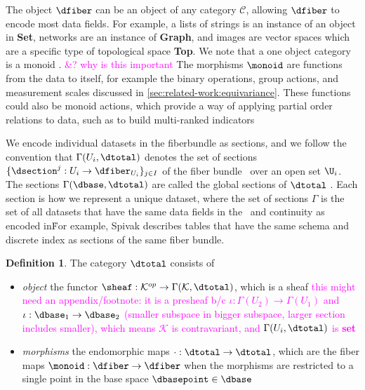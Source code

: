 \documentclass[10pt,journal,compsoc]{IEEEtran}
\newcommand{\note}[1]{\textcolor{magenta}{#1}}
\theoremstyle{definition}
\newtheorem{definition}{Definition}[section]
\theoremstyle{remark}
\begin{document}
The object $\texttt{\dfiber}$ can be an object of any category $\mathcal{C}$, allowing $\texttt{\dfiber}$ to encode most data fields. For example, a lists of strings is an instance of an object in \textbf{Set}, networks are an instance of \textbf{Graph}, and images are vector spaces which are a specific type of topological space \textbf{Top}. We note that a one object category is a monoid \cite{nlab:monoid,barrCategoryTheoryComputing}. \note{&? why is this important} The morphisms $\monoid$ are functions from the data to itself, for example the binary operations, group actions, and measurement scales discussed in \autoref{sec:related-work:equivariance}. These functions could also be monoid actions\cite{barrCategoryTheoryComputing}, which provide a way of applying partial order relations to data\cite{fongInvitationAppliedCategory2019}, such as to build multi-ranked indicators\cite{bruggemannRankingPrioritizationMultiindicator2011}

We encode individual datasets in the fiberbundle as sections, and we follow the convention that $\Gamma(U_i, \dtotal)$ denotes the set of sections $\{\dsection^{j}:U_i \rightarrow \dfiber_{U_{i}}\}_{j\in I}$ of the fiber bundle \dtotal\ over an open set $\U_{i}$.  The sections $\Gamma(\dbase, \dtotal)$ are called the global sections of $\dtotal$ \cite{SheafMathematics2021,spanier1989algebraic}. Each section is how we represent a unique dataset, where the set of sections $\Gamma$ is the set of all datasets that have the same data fields in the \dfiber\ and continuity as encoded in\dbase\. For example, Spivak describes tables that have the same schema and discrete index as sections of the same fiber bundle\cite{spivakSIMPLICIALDATABASES}.


\begin{definition} The category $\mathcal{\dtotal}$ consists of 
  \begin{itemize}
    \item\textit{object} the functor $\sheaf: \mathcal{K}^{op} \rightarrow \Gamma(\mathcal{K}, \dtotal)$, which is a sheaf\cite{spanier1989algebraic,SheafMathematics2021,nlab:presheaf} \note{this might need an appendix/footnote: it is a presheaf b/c $\iota:\Gamma(U_2)\rightarrow \Gamma(U_1)$ and $\iota: \dbase_1\rightarrow \dbase_2$ (smaller subspace in bigger subspace, larger section includes smaller), which means $\mathcal{K}$ is contravariant, and $\Gamma(U_{i}, \dtotal)$ is \textbf{set}}
    \item \textit{morphisms} the endomorphic\cite{fongInvitationAppliedCategory2019} maps $\cdot: \dtotal\rightarrow \dtotal$, which are the fiber maps $\monoid:\mathcal{\dfiber}\rightarrow \mathcal{\dfiber}$ when the morphisms are restricted to a single point in the base space $\dbasepoint\in \dbase$
  \end{itemize}
\end{definition}
\end{document}
